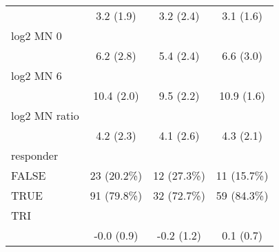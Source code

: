 \begin{table}[ ht ]
\begin{tabular}{ l c c c }
 \hspace{6pt}   & 3.2 (1.9) & 3.2 (2.4) & 3.1 (1.6)\\ 
 log2 MN 0  &   &   &  \\ 
 \hspace{6pt}   & 6.2 (2.8) & 5.4 (2.4) & 6.6 (3.0)\\ 
 log2 MN 6  &   &   &  \\ 
 \hspace{6pt}   & 10.4 (2.0) & 9.5 (2.2) & 10.9 (1.6)\\ 
 log2 MN ratio  &   &   &  \\ 
 \hspace{6pt}   & 4.2 (2.3) & 4.1 (2.6) & 4.3 (2.1)\\ 
 responder &   &   &  \\ 
 \hspace{6pt}    FALSE & 23 (20.2\%) & 12 (27.3\%) & 11 (15.7\%)\\ 
 \hspace{6pt}    TRUE & 91 (79.8\%) & 32 (72.7\%) & 59 (84.3\%)\\ 
 TRI &   &   &  \\ 
 \hspace{6pt}   & -0.0 (0.9) & -0.2 (1.2) & 0.1 (0.7)\\ 
 \bottomrule
 
 \end{tabular}
 \end{table}
